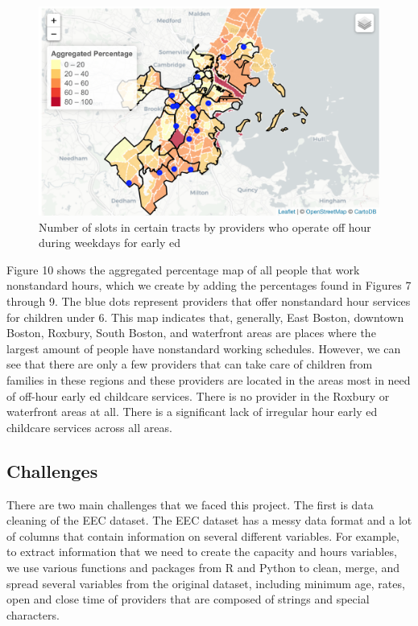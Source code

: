 \documentclass[10pt,letterpaper]{article}
\begin{document}
\begin{figure}

{\centering \includegraphics[width=1\linewidth]{aggregatehourdemand} 

}

\caption{Number of slots in certain tracts by providers who operate off hour during weekdays for early ed}\label{fig:unnamed-chunk-10}
\end{figure}

Figure 10 shows the aggregated percentage map of all people that work
nonstandard hours, which we create by adding the percentages found in
Figures 7 through 9. The blue dots represent providers that offer
nonstandard hour services for children under 6. This map indicates that,
generally, East Boston, downtown Boston, Roxbury, South Boston, and
waterfront areas are places where the largest amount of people have
nonstandard working schedules. However, we can see that there are only a
few providers that can take care of children from families in these
regions and these providers are located in the areas most in need of
off-hour early ed childcare services. There is no provider in the
Roxbury or waterfront areas at all. There is a significant lack of
irregular hour early ed childcare services across all areas.

\subsection{Challenges}\label{challenges}

There are two main challenges that we faced this project. The first is
data cleaning of the EEC dataset. The EEC dataset has a messy data
format and a lot of columns that contain information on several
different variables. For example, to extract information that we need to
create the capacity and hours variables, we use various functions and
packages from R and Python to clean, merge, and spread several variables
from the original dataset, including minimum age, rates, open and close
time of providers that are composed of strings and special characters.
\end{document}
